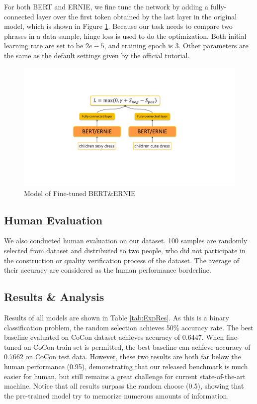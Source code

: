 For both BERT and ERNIE, we fine tune the network by adding a fully-connected layer over the first token obtained by the last layer in the original model, which is shown in Figure \ref{fig:tuneNet}. Because our task needs to compare two phrases in a data sample, hinge loss is used to do the optimization. Both initial learning rate are set to be $2e-5$, and training epoch is 3. Other parameters are the same as the default settings given by the official tutorial.

\begin{figure}[h!]
	\centering
	\includegraphics[width=0.8\columnwidth]{images/fineTuneNetwork.pdf}
	\caption{Model of Fine-tuned BERT\&ERNIE}
	\label{fig:tuneNet}
\end{figure}


\subsection{Human Evaluation}
We also conducted human evaluation on our dataset. 100 samples are randomly selected from dataset and distributed to two people, who did not participate in the construction or quality verification process of the dataset. The average of their accuracy are considered as the human performance borderline. 


\subsection{Results \& Analysis}
Results of all models are shown in Table \ref{tab:ExpRes}. As this is a binary classification problem, the random selection achieves 50\% accuracy rate. 
The best baseline evaluated on CoCon dataset achieves accuracy of 0.6447. When fine-tuned on CoCon train set is permitted, the best baseline can achieve accuracy of 0.7662 on CoCon test data. However, these two results are both far below the human performance (0.95), demonstrating that our released benchmark is much easier for human, but still remains a great challenge for current state-of-the-art machine. Notice that all results surpass the random choose (0.5), showing that the pre-trained model %
try to memorize numerous amounts of information.

